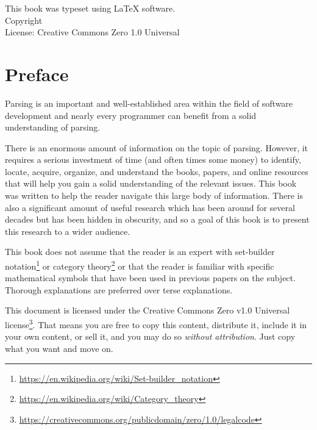 \documentclass{book}
\makeatletter
\newcommand{\booklicense}{Creative Commons Zero 1.0 Universal}
\newcommand{\bookauthor}{\@author}
\makeatother
\begin{document}
\thispagestyle{empty}

\begin{flushleft}
\vspace*{\fill}
This book was typeset using \LaTeX{} software.\\
\vspace{\fill}
Copyright \textcopyright{} \the\year{}  \bookauthor\\
License: \booklicense
\end{flushleft}

\addtocounter{page}{2}

%
%

\chapter*{Preface}
Parsing is an important and well-established area within the field
of software development and nearly every programmer can benefit 
from a solid understanding of parsing. 

There is an enormous amount of information on the topic of parsing.
However, it requires a serious investment of time 
(and often times some money) to 
identify, locate, acquire, organize, and understand the books, papers, 
and online resources that will help you gain a solid 
understanding of the relevant issues. 
This book was written to help the reader navigate this large body of
information. There is also a significant 
amount of useful research which has been around
for several decades but has been hidden in obscurity, and so
a goal of this book is to present this research to a wider audience.

This book does not assume that the reader is an expert with set-builder 
notation\footnote{\url{https://en.wikipedia.org/wiki/Set-builder_notation}}
or category theory\footnote{\url{https://en.wikipedia.org/wiki/Category_theory}}
or that the reader is familiar with specific mathematical symbols
that have been used in previous papers on the subject.
Thorough explanations are preferred over terse explanations.

This document is licensed under the Creative
Commons Zero v1.0 Universal 
license\footnote{\url{https://creativecommons.org/publicdomain/zero/1.0/legalcode}}.
That means you are free to copy this content,
distribute it, include it in your own content, or sell it, and you may do so
\textit{without attribution}. Just copy what you want and move on.
\end{document}
